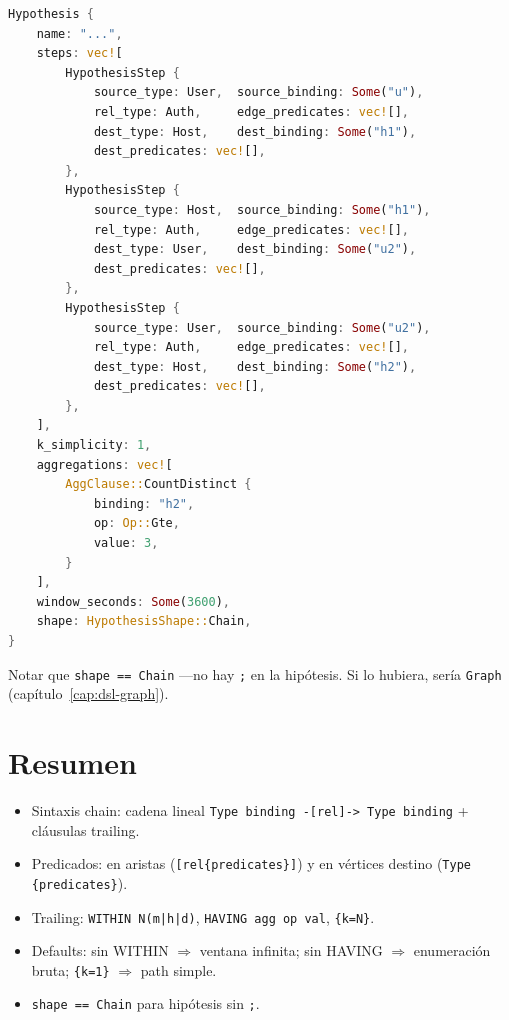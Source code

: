 \begin{lstlisting}[language=Rust]
Hypothesis {
    name: "...",
    steps: vec![
        HypothesisStep {
            source_type: User,  source_binding: Some("u"),
            rel_type: Auth,     edge_predicates: vec![],
            dest_type: Host,    dest_binding: Some("h1"),
            dest_predicates: vec![],
        },
        HypothesisStep {
            source_type: Host,  source_binding: Some("h1"),
            rel_type: Auth,     edge_predicates: vec![],
            dest_type: User,    dest_binding: Some("u2"),
            dest_predicates: vec![],
        },
        HypothesisStep {
            source_type: User,  source_binding: Some("u2"),
            rel_type: Auth,     edge_predicates: vec![],
            dest_type: Host,    dest_binding: Some("h2"),
            dest_predicates: vec![],
        },
    ],
    k_simplicity: 1,
    aggregations: vec![
        AggClause::CountDistinct {
            binding: "h2",
            op: Op::Gte,
            value: 3,
        }
    ],
    window_seconds: Some(3600),
    shape: HypothesisShape::Chain,
}
\end{lstlisting}

\noindent
Notar que \texttt{shape == Chain} ---no hay \texttt{;} en la
hipótesis. Si lo hubiera, sería \texttt{Graph}
(capítulo~\ref{cap:dsl-graph}).

\section{Resumen}

\begin{itemize}
    \item Sintaxis chain: cadena lineal \texttt{Type binding -[rel]-> Type binding}
    + cláusulas trailing.
    \item Predicados: en aristas (\texttt{[rel\{predicates\}]}) y
    en vértices destino (\texttt{Type \{predicates\}}).
    \item Trailing: \texttt{WITHIN N(m|h|d)}, \texttt{HAVING agg op
    val}, \texttt{\{k=N\}}.
    \item Defaults: sin WITHIN $\Rightarrow$ ventana infinita;
    sin HAVING $\Rightarrow$ enumeración bruta; \texttt{\{k=1\}}
    $\Rightarrow$ path simple.
    \item \texttt{shape == Chain} para hipótesis sin \texttt{;}.
\end{itemize}

